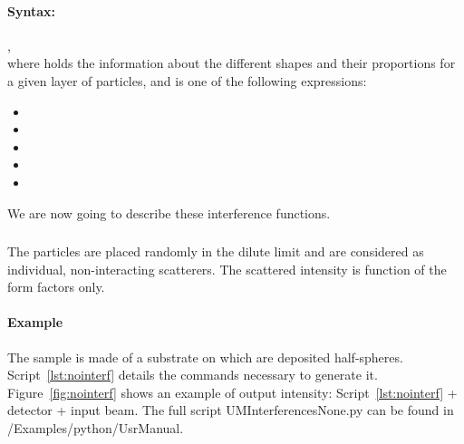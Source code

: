 \paragraph{Syntax:}
 ,\\ where  holds the information about the different shapes and their proportions for a given layer of particles, and   is one of the following expressions:
\begin{itemize}
\item {}
\item {}
\item {}
\item {}
\item {}
\end{itemize}
We are now going to describe these interference functions.\\



\newpage
\subsubsection{ } \label{paragraphnointerf}
The particles are placed randomly in the dilute limit and are considered as individual, non-interacting scatterers. The scattered intensity is function of the form factors only. 

\paragraph{Example} The sample is made of a substrate on which are deposited half-spheres. Script~\ref{lst:nointerf} details the commands necessary to generate it. Figure~\ref{fig:nointerf} shows an example of output intensity: Script~\ref{lst:nointerf}  + detector + input beam. The full script UMInterferencesNone.py can be found in /Examples/python/UsrManual. 


